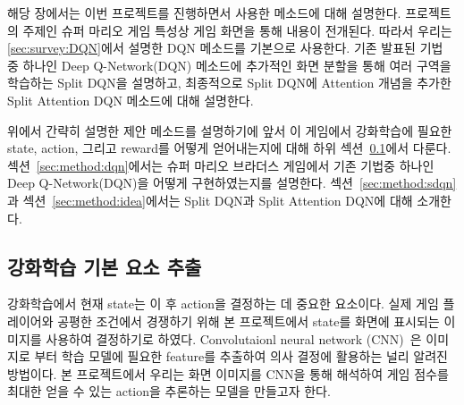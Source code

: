 해당 장에서는 이번 프로젝트를 진행하면서 사용한 메소드에 대해 설명한다.
프로젝트의 주제인 슈퍼 마리오 게임 특성상 게임 화면을 통해 내용이 전개된다. 
따라서 우리는 \ref{sec:survey:DQN}에서 설명한 DQN 메소드를 기본으로 사용한다.
기존 발표된 기법 중 하나인 Deep Q-Network(DQN) 메소드에 추가적인 화면 분할을 통해 여러 구역을 학습하는 Split DQN을 설명하고, 최종적으로 Split DQN에 Attention 개념을 추가한 Split Attention DQN 메소드에 대해 설명한다.

위에서 간략히 설명한 제안 메소드를 설명하기에 앞서 이 게임에서 강화학습에 필요한 state, action, 그리고 reward를 어떻게 얻어내는지에 대해 하위 섹션~\ref{sec:method:basis}에서 다룬다.
섹션~\ref{sec:method:dqn}에서는 슈퍼 마리오 브라더스 게임에서 기존 기법중 하나인 Deep Q-Network(DQN)을 어떻게 구현하였는지를 설명한다.
섹션~\ref{sec:method:sdqn}과 섹션~\ref{sec:method:idea}에서는 Split DQN과 Split Attention DQN에 대해 소개한다.

\subsection{강화학습 기본 요소 추출}
\label{sec:method:basis}
강화학습에서 현재 state는 이 후 action을 결정하는 데 중요한 요소이다.
실제 게임 플레이어와 공평한 조건에서 경쟁하기 위해 본 프로젝트에서 state를 화면에 표시되는 이미지를 사용하여 결정하기로 하였다.
Convolutaionl neural network (CNN)~\cite{CNN}은 이미지로 부터 학습 모델에 필요한 feature를 추출하여 의사 결정에 활용하는 널리 알려진 방법이다.
본 프로젝트에서 우리는 화면 이미지를 CNN을 통해 해석하여 게임 점수를 최대한 얻을 수 있는 action을 추론하는 모델을 만들고자 한다.

